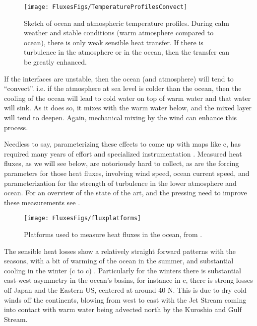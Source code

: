 \begin{figure}[htb]
\texttt{[image: FluxesFigs/TemperatureProfilesConvect]}
 \caption{Sketch of ocean and atmospheric temperature profiles.  During calm weather and stable conditions (warm atmosphere compared to ocean), there is only weak sensible heat transfer.  If there is turbulence in the atmosphere or in the ocean, then the transfer can be greatly enhanced.}
  \label{fig:TemperatureProfilesConvect}
\end{figure}

If the interfaces are unstable, then the ocean (and atmosphere) will tend to ``convect''.  i.e. if the atmosphere at sea level is colder than the ocean, then the cooling of the ocean will lead to cold water on top of warm water and that water will sink.  As it does so, it mixes with the warm water below, and the mixed layer will tend to deepen. Again, mechanical mixing by the wind can enhance this process.

Needless to say, parameterizing these effects to come up with maps like c, has required many years of effort and specialized instrumentation .  Measured heat fluxes, as we will see below, are notoriously hard to collect, as are the forcing parameters for those heat fluxes, involving wind speed, ocean current speed, and parameterization for the strength of turbulence in the lower atmosphere and ocean.  For an overview of the state of the art, and the pressing need to improve these measurements see \citet{croninetal19}.  

\begin{figure}[htb]
\texttt{[image: FluxesFigs/fluxplatforms]}
 \caption{Platforms used to measure heat fluxes in the ocean, from \citet{croninetal19}.}
  \label{fig:fluxplatforms}
\end{figure}

The sensible heat losses show a relatively straight forward patterns with the seasons, with a bit of warming of the ocean in the summer, and substantial cooling in the winter (c to c) .  Particularly for the winters there is substantial east-west asymmetry in the ocean's basins, for instance in c, there is strong losses off Japan and the Eastern US, centered at around 40 N.  This is due to dry cold winds off the continents, blowing from west to east with the Jet Stream coming into contact with warm water being advected north by the Kuroshio and Gulf Stream.  

